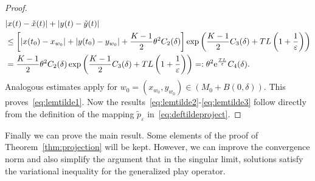 \documentclass[12pt]{article}
\def\txte{{\textnormal{e}}}
\begin{document}
\begin{proof}
\begin{align*}
&| x(t) - \tilde{x}(t)|
	+ | y(t) - \tilde{y}(t)|\\
&\leq \left[ | x(t_{0}) - x_{w_{0}}| + | y(t_{0}) - y_{w_{0}}|+
\frac{K-1}{2}\theta^2 C_2(\delta)\right]
\exp\left(\frac{K-1}{2}C_3(\delta)+TL\left(1+\frac{1}{\varepsilon}\right)
\right)\\
&=\frac{K-1}{2}
\theta^2 C_2(\delta)
\exp\left(\frac{K-1}{2}C_3(\delta)+TL\left(1+\frac{1}{\varepsilon}\right)
\right)=:\theta^2\txte^{\frac{TL}{\varepsilon}}C_4(\delta).
\end{align*}
Analogous estimates apply for $w_0=(x_{w_0},y_{w_0})\in (M_0+B(0,\delta))$.
This proves~\eqref{eq:lemtilde1}. Now the 
results~\eqref{eq:lemtilde2}-\eqref{eq:lemtilde3} follow directly from
the definition of the mapping $\tilde{p}_\varepsilon$ 
in~\eqref{eq:deftildeproject}. 
\end{proof}

Finally we can prove the main result. Some elements of the proof of 
Theorem~\ref{thm:projection} will be kept. However, we can improve the
convergence norm and also simplify the argument that in the singular
limit, solutions satisfy the variational inequality for the generalized 
play operator.
\end{document}
